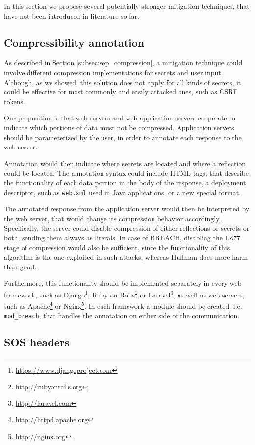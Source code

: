 In this section we propose several potentially stronger mitigation techniques,
that have not been introduced in literature so far.

\subsection{Compressibility annotation}\label{subsec:annotation}

As described in Section \ref{subsec:sep_compression}, a mitigation technique
could involve different compression implementations for secrets and user input.
Although, as we showed, this solution does not apply for all kinds of secrets,
it could be effective for most commonly and easily attacked ones, such as CSRF
tokens.

Our proposition is that web servers and web application servers cooperate to
indicate which portions of data must not be compressed. Application servers
should be parameterized by the user, in order to annotate each response to the
web server.

Annotation would then indicate where secrets are located and where a reflection
could be located. The annotation syntax could include HTML tags, that describe
the functionality of each data portion in the body of the response, a deployment
descriptor, such as \texttt{web.xml} used in Java applications, or a new special
format.

The annotated response from the application server would then be interpreted by
the web server, that would change its compression behavior accordingly.
Specifically, the server could disable compression of either reflections or
secrets or both, sending them always as literals. In case of BREACH, disabling
the LZ77 stage of compression would also be sufficient, since the functionality
of this algorithm is the one exploited in such attacks, whereas Huffman does
more harm than good.

Furthermore, this functionality should be implemented separately in every web
framework, such as Django\footnote{\url{https://www.djangoproject.com}}, Ruby on
Rails\footnote{\url{http://rubyonrails.org}} or
Laravel\footnote{\url{http://laravel.com}}, as well as web servers, such as
Apache\footnote{\url{http://httpd.apache.org}} or
Nginx\footnote{\url{http://nginx.org}}. In each framework a module should be
created, i.e. \texttt{mod\_breach}, that handles the annotation on either side
of the communication.

\subsection{SOS headers}\label{subsec:sos}

